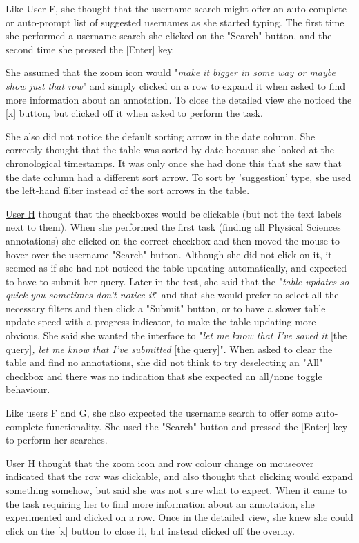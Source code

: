 Like User F, she thought that the username search might offer an auto-complete or auto-prompt list of suggested usernames as she started typing. The first time she performed a username search she clicked on the "Search" button, and the second time she pressed the [Enter] key. 

She assumed that the zoom icon would "\textit{make it bigger in some way or maybe show just that row}" and simply clicked on a row to expand it when asked to find more information about an annotation. To close the detailed view she noticed the [x] button, but clicked off it when asked to perform the task. 

She also did not notice the default sorting arrow in the date column. She correctly thought that the table was sorted by date because she looked at the chronological timestamps. It was only once she had done this that she saw that the date column had a different sort arrow. To sort by 'suggestion' type, she used the left-hand filter instead of the sort arrows in the table. 

\underline{User H} thought that the checkboxes would be clickable (but not the text labels next to them). When she performed the first task (finding all Physical Sciences annotations) she clicked on the correct checkbox and then moved the mouse to hover over the username "Search" button. Although she did not click on it, it seemed as if she had not noticed the table updating automatically, and expected to have to submit her query. Later in the test, she said that the "\textit{table updates so quick you sometimes don't notice it}" and that she would prefer to select all the necessary filters and then click a "Submit" button, or to have a slower table update speed with a progress indicator, to make the table updating more obvious. She said she wanted the interface to "\textit{let me know that I've saved it} [the query]\textit{, let me know that I've submitted} [the query]". When asked to clear the table and find no annotations, she did not think to try deselecting an "All" checkbox and there was no indication that she expected an all/none toggle behaviour.

Like users F and G, she also expected the username search to offer some auto-complete functionality. She used the "Search" button and pressed the [Enter] key to perform her searches. 

User H thought that the zoom icon and row colour change on mouseover indicated that the row was clickable, and also thought that clicking would expand something somehow, but said she was not sure what to expect. When it came to the task requiring her to find more information about an annotation, she experimented and clicked on a row. Once in the detailed view, she knew she could click on the [x] button to close it, but instead clicked off the overlay. 

